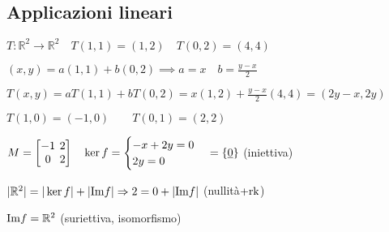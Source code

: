\subsection{Applicazioni lineari}
$T: \mathbb{R}^2 \rightarrow \mathbb{R}^2 \quad T(1,1) = (1,2) \quad T(0,2) = (4,4)$

$(x,y) = a(1,1) + b(0,2) \implies a = x \quad b = \frac{y-x}{2}$

$T(x,y) = aT(1,1) + bT(0,2) = x(1,2) + \frac{y-x}{2}(4,4) = (2y-x, 2y)$

$T(1,0) = (-1,0) \qquad T(0,1) = (2,2)$

$M = \left[
	\arraycolsep=2.0pt\def\arraystretch{1.0}
	\begin{array}{@{}cc@{}}
		-1 & 2 \\
		0 & 2 \\
	\end{array}
\right]
\quad
\ker f = \begin{cases}
	-x +2y = 0 \\
	2y = 0 \\
\end{cases}
= \{\vec{0}\}
$ (iniettiva)

$|\mathbb{R}^2| = |\ker f| + |\mathrm{Im} f| \Rightarrow 2 = 0 + |\mathrm{Im} f|$ (nullità$+\mathrm{rk}$)

$\mathrm{Im} f = \mathbb{R}^2$ (suriettiva, isomorfismo)
